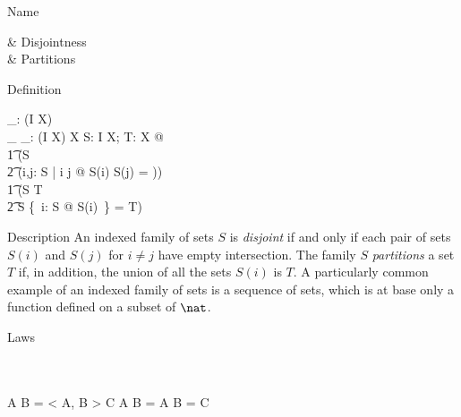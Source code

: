 \begin{manpage}\label{p:4080}
\item[Name]
\begin{name}
        \disjoint  & Disjointness\index{$\disjoint\unskip$} \\
        \partition & Partitions\index{$\partition$}
\end{name}

\item[Definition]
\begin{gendef}[I,X]
        \disjoint \_: \power (I \pfun \power X) \\
        \_ \partition \_: (I \pfun \power X) \rel \power X
\where
        \forall S: I \pfun \power X; T: \power X @ \\
\t1         (\disjoint S \iff \\
\t2             (\forall i,j: \dom S | i \neq j @ %
                                        S(i) \cap S(j) = \empty)) \land \\
\t1         (S \partition T \iff \\
\t2             \disjoint S \land \bigcup \{~i: \dom S @ S(i)~\} = T)
\end{gendef}

\item[Description]
An indexed family of sets $S$
is {\em disjoint\/} if and only if
each pair of sets $S(i)$ and $S(j)$ for $i \neq j$ have empty
intersection. The family $S$ {\em partitions\/} a set $T$ if, in
addition, the union of all the sets $S(i)$ is $T$. A particularly
common example of an indexed family of sets is a 
sequence of sets,
which is at base only a function defined on a subset of $\nat$.

\item[Laws]
\begin{laws}
        \disjoint \empty \\
         \\
         \iff A \cap B = \empty
\also
        < A, B > \partition C \iff %
                        A \cap B = \empty \land A \cup B = C
\end{laws}
\end{manpage}
